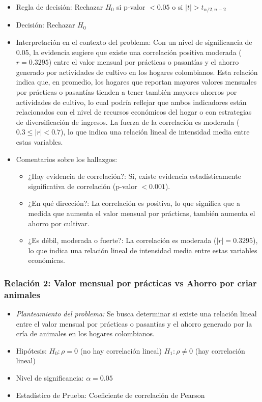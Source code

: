 \documentclass[12pt,a4paper]{article}
\begin{document}
\begin{itemize}
    \item Regla de decisión: Rechazar $H_0$ si p-valor $< 0.05$ o si $|t| > t_{\alpha/2, n-2}$
    \item Decisión: Rechazar $H_0$
    \item Interpretación en el contexto del problema: Con un nivel de significancia de 0.05, la evidencia sugiere que existe una correlación positiva moderada ($r = 0.3295$) entre el valor mensual por prácticas o pasantías y el ahorro generado por actividades de cultivo en los hogares colombianos. Esta relación indica que, en promedio, los hogares que reportan mayores valores mensuales por prácticas o pasantías tienden a tener también mayores ahorros por actividades de cultivo, lo cual podría reflejar que ambos indicadores están relacionados con el nivel de recursos económicos del hogar o con estrategias de diversificación de ingresos. La fuerza de la correlación es moderada ($0.3 \leq |r| < 0.7$), lo que indica una relación lineal de intensidad media entre estas variables.
    \item Comentarios sobre los hallazgos:
    \begin{itemize}
        \item ¿Hay evidencia de correlación?: Sí, existe evidencia estadísticamente significativa de correlación (p-valor $< 0.001$).
        \item ¿En qué dirección?: La correlación es positiva, lo que significa que a medida que aumenta el valor mensual por prácticas, también aumenta el ahorro por cultivar.
        \item ¿Es débil, moderada o fuerte?: La correlación es moderada ($|r| = 0.3295$), lo que indica una relación lineal de intensidad media entre estas variables económicas.
    \end{itemize}
\end{itemize}

\subsubsection*{Relación 2: Valor mensual por prácticas vs Ahorro por criar animales}

\begin{itemize}
    \item \textit{Planteamiento del problema:} Se busca determinar si existe una relación lineal entre el valor mensual por prácticas o pasantías y el ahorro generado por la cría de animales en los hogares colombianos.
    \item Hipótesis: \quad $H_0: \rho = 0$ (no hay correlación lineal) \hspace{1cm} $H_1: \rho \neq 0$ (hay correlación lineal)
    \item Nivel de significancia: $\alpha = 0.05$
    \item Estadístico de Prueba: Coeficiente de correlación de Pearson
\end{itemize}
\end{document}
